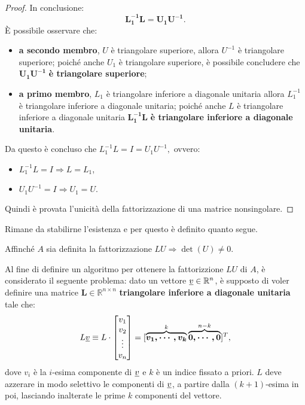 \begin{proof}
    In conclusione: \begin{equation*}
        \boldsymbol{L_1^{-1}L}=\boldsymbol{U_1U^{-1}}.
    \end{equation*}
    È possibile osservare che:
    \begin{itemize}
        \item \textbf{a secondo membro}, $U$ è triangolare superiore, allora $U^{-1}$ è triangolare superiore; poiché anche $U_1$ è triangolare superiore, è possibile concludere che $\boldsymbol{U_1U^{-1}}$ \textbf{è triangolare superiore};
        \item \textbf{a primo membro}, $L_1$ è triangolare inferiore a diagonale unitaria allora $L_1^{-1}$ è triangolare inferiore a diagonale unitaria; poiché anche $L$ è triangolare inferiore a diagonale unitaria $\boldsymbol{L_1^{-1}L}$ \textbf{è triangolare inferiore a diagonale unitaria}.
    \end{itemize}
    Da questo è concluso che $L_1^{-1}L=I=U_1U^{-1},$ ovvero:
    \begin{itemize}
        \item $L_1^{-1}L=I\Rightarrow L=L_1$,
        \item $U_1U^{-1}=I\Rightarrow U_1=U.$
    \end{itemize}
    Quindi è provata l'unicità della fattorizzazione di una matrice nonsingolare.
\end{proof}

Rimane da stabilirne l'esistenza e per questo è definito quanto segue.

\begin{remark}
    Affinché $A$ sia definita la fattorizzazione $LU\Rightarrow\det(U)\neq 0$.
\end{remark}

Al fine di definire un algoritmo per ottenere la fattorizzione $LU$ di $A$, è considerato il seguente problema: dato un vettore $\uline v\in\mathbb R^n$, è supposto di voler definire una matrice $\boldsymbol L\in\mathbb R^{n\times n}$ \textbf{triangolare inferiore a diagonale unitaria} tale che:
\begin{equation}\label{eq:Lv}
    L\uline v \equiv L\cdot \begin{bmatrix}
        v_1\\
        v_2\\
        \vdots\\
        v_n
    \end{bmatrix}=[\overbrace{\boldsymbol{v_1,\cdots, v_k}}^{k}\overbrace{\boldsymbol{0,\cdots, 0}}^{n-k}]^T,
\end{equation}
dove $v_i$ è la $i$-esima componente di $\uline v$ e $k$ è un indice fissato a priori. $L$ deve azzerare in modo selettivo le componenti di $\uline v$, a partire dalla $(k+1)$-esima in poi, lasciando inalterate le prime $k$ componenti del vettore.

